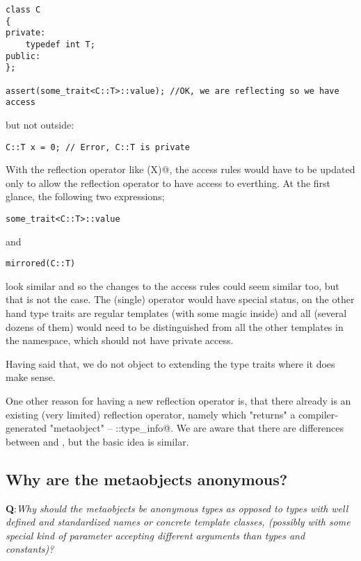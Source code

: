 \begin{verbatim}
class C
{
private:
	typedef int T;
public:
};

assert(some_trait<C::T>::value); //OK, we are reflecting so we have access
\end{verbatim}

but not outside:

\begin{verbatim}
C::T x = 0; // Error, C::T is private
\end{verbatim}

With the reflection operator like \verb@mirrored(X)@, the access rules would have
to be updated only to allow the reflection operator to have access to everthing.
At the first glance, the following two expressions;

\begin{verbatim}
some_trait<C::T>::value
\end{verbatim}

and

\begin{verbatim}
mirrored(C::T)
\end{verbatim}

look similar and so the changes to the access rules could seem similar too, but
that is not the case. The (single) \verb@mirrored@ operator would have special status,
on the other hand type traits are regular templates (with some magic inside) and
all (several dozens of them) would need to be distinguished from all the other templates
in the \verb@std@ namespace, which should not have private access.

Having said that, we do not object to extending the type traits where it does make sense.

One other reason for having a new reflection operator is, that there already is an
existing (very limited) reflection operator, namely \verb@typeid@ which "returns"
a compiler-generated "metaobject" -- \verb@std::type_info@. We are aware that there
are differences between \verb@typeid@ and \verb@mirrored@, but the basic idea is similar.

\subsection{Why are the metaobjects anonymous?}

{\textbf Q:}{\em Why should the metaobjects be anonymous types as opposed to
types with well defined and standardized names or concrete template classes, (possibly with some
special kind of parameter accepting different arguments than types and constants)?}

